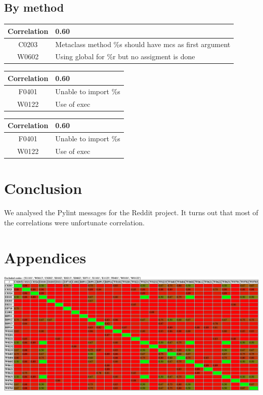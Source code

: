 \documentclass[12pt, a4paper]{article}
\newcommand{\tbf}[1]{\textbf{#1}}
\newcommand{\noi}{\noindent}
\newcommand{\pyl}{\textsf{Pylint}}
\begin{document}
\subsection{By method}

\bigskip \noi
\begin{tabularx}{\textwidth}{|c|X|}
\hline
\tbf{Correlation}   & 0.60 \\
\hline
C0203   &  Metaclass method \%s should have mcs as first argument \\
\hline
W0602   &  Using global for \%r but no assigment is done \\
\hline
\end{tabularx}


\bigskip \noi
\begin{tabularx}{\textwidth}{|c|X|}
\hline
\tbf{Correlation}   & 0.60 \\
\hline
F0401   &  Unable to import \%s \\
\hline
W0122   &  Use of exec \\
\hline
\end{tabularx}

\bigskip \noi
\begin{tabularx}{\textwidth}{|c|X|}
\hline
\tbf{Correlation}   & 0.60 \\
\hline
F0401   &  Unable to import \%s \\
\hline
W0122   &  Use of exec \\
\hline
\end{tabularx}



\bigskip
\section{Conclusion}

We analysed the \pyl{} messages for the Reddit project.
It turns out that most of the correlations were unfortunate correlation.



\newpage
\section*{Appendices}

\renewcommand{\textfraction}{0.01}
\renewcommand{\topfraction}{0.01}
\renewcommand{\bottomfraction}{0.01}
\renewcommand{\floatpagefraction}{0.01}
\setcounter{totalnumber}{1}

\includegraphics[angle=90,origin=c,totalheight=0.99\textheight]{cap1}
\end{document}
